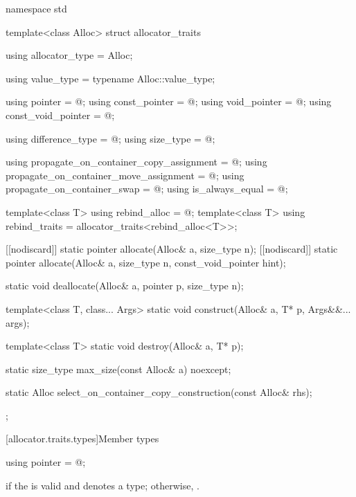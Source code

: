 %
\begin{codeblock}
namespace std {
  template<class Alloc> struct allocator_traits {
    using allocator_type     = Alloc;

    using value_type         = typename Alloc::value_type;

    using pointer            = @\seebelow@;
    using const_pointer      = @\seebelow@;
    using void_pointer       = @\seebelow@;
    using const_void_pointer = @\seebelow@;

    using difference_type    = @\seebelow@;
    using size_type          = @\seebelow@;

    using propagate_on_container_copy_assignment = @\seebelow@;
    using propagate_on_container_move_assignment = @\seebelow@;
    using propagate_on_container_swap            = @\seebelow@;
    using is_always_equal                        = @\seebelow@;

    template<class T> using rebind_alloc = @\seebelow@;
    template<class T> using rebind_traits = allocator_traits<rebind_alloc<T>>;

    [[nodiscard]] static pointer allocate(Alloc& a, size_type n);
    [[nodiscard]] static pointer allocate(Alloc& a, size_type n, const_void_pointer hint);

    static void deallocate(Alloc& a, pointer p, size_type n);

    template<class T, class... Args>
      static void construct(Alloc& a, T* p, Args&&... args);

    template<class T>
      static void destroy(Alloc& a, T* p);

    static size_type max_size(const Alloc& a) noexcept;

    static Alloc select_on_container_copy_construction(const Alloc& rhs);
  };
}
\end{codeblock}

[allocator.traits.types]{Member types}

%
\begin{itemdecl}
using pointer = @\seebelow@;
\end{itemdecl}

\begin{itemdescr}
\pnum
\ctype {} if
the   is valid and denotes a
type; otherwise, .
\end{itemdescr}

